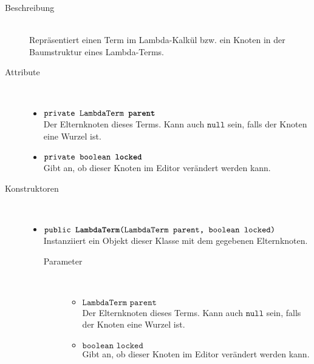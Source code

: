 \begin{description}
\item[Beschreibung] \hfill \\ Repräsentiert einen Term im Lambda-Kalkül bzw. ein Knoten in der Baumstruktur eines Lambda-Terms.

\item[Attribute] \hfill \\
	\vspace{-.8cm}
	\begin{itemize}
		\item $\texttt{private LambdaTerm \textbf{parent}}$ \\ Der Elternknoten dieses Terms. Kann auch $\texttt{null}$ sein, falls der Knoten eine Wurzel ist.
		\item $\texttt{private boolean \textbf{locked}}$ \\ Gibt an, ob dieser Knoten im Editor verändert werden kann.
	\end{itemize}
	
\item[Konstruktoren] \hfill \\
	\vspace{-.8cm}
	\begin{itemize}
		\item $\texttt{public \textbf{LambdaTerm}(LambdaTerm parent, boolean locked)}$ \\ Instanziiert ein Objekt dieser Klasse mit dem gegebenen Elternknoten.
		\begin{description}
			\item[Parameter] \hfill \\
			\vspace{-.8cm}
			\begin{itemize}
				\item $\texttt{LambdaTerm parent}$ \\ Der Elternknoten dieses Terms. Kann auch $\texttt{null}$ sein, falls der Knoten eine Wurzel ist.
				\item $\texttt{boolean locked}$ \\ Gibt an, ob dieser Knoten im Editor verändert werden kann.
			\end{itemize}
		\end{description}
	\end{itemize}
	

\end{description}

